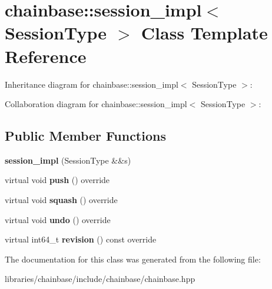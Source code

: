 \hypertarget{classchainbase_1_1session__impl}{}\section{chainbase\+:\+:session\+\_\+impl$<$ Session\+Type $>$ Class Template Reference}
\label{classchainbase_1_1session__impl}


Inheritance diagram for chainbase\+:\+:session\+\_\+impl$<$ Session\+Type $>$\+:


Collaboration diagram for chainbase\+:\+:session\+\_\+impl$<$ Session\+Type $>$\+:
\subsection*{Public Member Functions}
\begin{DoxyCompactItemize}
\item 
\mbox{\label{classchainbase_1_1session__impl_a099ea0ee7f15797b4c8882977ebb15b3}} 
{\bfseries session\+\_\+impl} (Session\+Type \&\&s)
\item 
\mbox{\label{classchainbase_1_1session__impl_a0bdd3f1a1fdf3a535e6a69ae4b4b4ff6}} 
virtual void {\bfseries push} () override
\item 
\mbox{\label{classchainbase_1_1session__impl_a50ff04b638e1eeb12172ba724055cf5c}} 
virtual void {\bfseries squash} () override
\item 
\mbox{\label{classchainbase_1_1session__impl_a88e6d59f68481f0f186eb8a5d182008c}} 
virtual void {\bfseries undo} () override
\item 
\mbox{\label{classchainbase_1_1session__impl_a367cd9a5bd3339ee61c5b430c4744a95}} 
virtual int64\+\_\+t {\bfseries revision} () const override
\end{DoxyCompactItemize}


The documentation for this class was generated from the following file\+:\begin{DoxyCompactItemize}
\item 
libraries/chainbase/include/chainbase/chainbase.\+hpp\end{DoxyCompactItemize}
